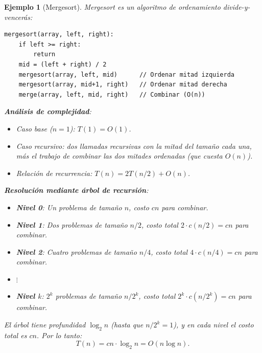 \documentclass[a4paper,11pt]{report}
\newtheorem{example}[theorem]{Ejemplo}
\begin{document}
\begin{example}[Mergesort]
Mergesort es un algoritmo de ordenamiento divide-y-vencerás:
\begin{verbatim}
mergesort(array, left, right):
    if left >= right:
        return
    mid = (left + right) / 2
    mergesort(array, left, mid)      // Ordenar mitad izquierda
    mergesort(array, mid+1, right)   // Ordenar mitad derecha
    merge(array, left, mid, right)   // Combinar (O(n))
\end{verbatim}

\textbf{Análisis de complejidad}:
\begin{itemize}
\item Caso base ($n = 1$): $T(1) = O(1)$.
\item Caso recursivo: dos llamadas recursivas con la mitad del tamaño cada una, más el trabajo de combinar las dos mitades ordenadas (que cuesta $O(n)$).
\item Relación de recurrencia: $T(n) = 2T(n/2) + O(n)$.
\end{itemize}

\textbf{Resolución mediante árbol de recursión}:
\begin{itemize}
\item \textbf{Nivel 0}: Un problema de tamaño $n$, costo $cn$ para combinar.
\item \textbf{Nivel 1}: Dos problemas de tamaño $n/2$, costo total $2 \cdot c(n/2) = cn$ para combinar.
\item \textbf{Nivel 2}: Cuatro problemas de tamaño $n/4$, costo total $4 \cdot c(n/4) = cn$ para combinar.
\item $\vdots$
\item \textbf{Nivel $k$}: $2^k$ problemas de tamaño $n/2^k$, costo total $2^k \cdot c(n/2^k) = cn$ para combinar.
\end{itemize}

El árbol tiene profundidad $\log_2 n$ (hasta que $n/2^k = 1$), y en cada nivel el costo total es $cn$. Por lo tanto:
\[
T(n) = cn \cdot \log_2 n = O(n \log n).
\]
\end{example}
\end{document}
